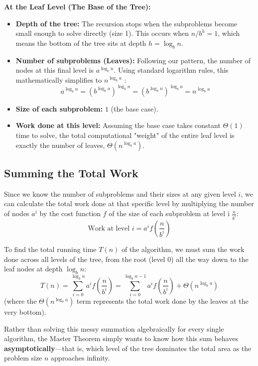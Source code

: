 \documentclass[11pt, a4paper]{article}
\begin{document}
\vspace{0.5cm}
\noindent\textbf{At the Leaf Level (The Base of the Tree):}
\begin{itemize}
    \item \textbf{Depth of the tree:} The recursion stops when the subproblems become small enough to solve directly (size 1). This occurs when $n/b^h= 1$, which means the bottom of the tree sits at depth $h = \log_b n$.
    \item \textbf{Number of subproblems (Leaves):} Following our pattern, the number of nodes at this final level is $a^{\log_b n}$. Using standard logarithm rules, this mathematically simplifies to $n^{\log_b a}$ :
        \[ a^{\log_b n} = (b^{\log_b a})^{\log_b n} = (b^{\log_b n})^{\log_b a} = n^{\log_b a} \]
    \item \textbf{Size of each subproblem:} $1$ (the base case).
    \item \textbf{Work done at this level:} Assuming the base case takes constant $\Theta(1)$ time to solve, the total computational "weight" of the entire leaf level is exactly the number of leaves, $\Theta(n^{\log_b a})$. 
\end{itemize}

\subsection*{Summing the Total Work} 
Since we know the number of subproblems and their sizes at any given level $i$, we can calculate the total work done at that specific level by multiplying the number of nodes $a^i$ by the cost function $f$ of the size of each subproblem at level i $\frac{n}{b^i}$:
\begin{equation*}
    \text{Work at level } i = a^i f\left(\frac{n}{b^i}\right)
\end{equation*}

To find the total running time $T(n)$ of the algorithm, we must sum the work done across all levels of the tree, from the root (level 0) all the way down to the leaf nodes at depth $\log_b n$:
\begin{equation*}
    T(n) = \sum_{i=0}^{\log_b n} a^i f\left(\frac{n}{b^i}\right) = \sum_{i=0}^{\log_b n - 1} a^i f\left(\frac{n}{b^i}\right) + \Theta(n^{\log_b a})
\end{equation*}
(where the $\Theta(n^{\log_b a})$ term represents the total work done by the leaves at the very bottom).

Rather than solving this messy summation algebraically for every single algorithm, the Master Theorem simply wants to know how this sum behaves \textbf{asymptotically}---that is, which level of the tree dominates the total area as the problem size $n$ approaches infinity. 
\newpage
\end{document}
